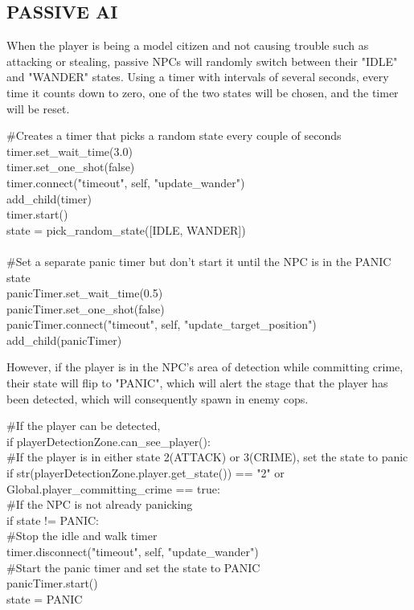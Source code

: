 \documentclass{article}
\begin{document}
\subsection{PASSIVE AI \label{passAI}}
When the player is being a model citizen and not causing trouble such as attacking or stealing, passive NPCs will randomly switch between their "IDLE" and "WANDER" states. Using a timer with intervals of several seconds, every time it counts down to zero, one of the two states will be chosen, and the timer will be reset.
\bigbreak
\begin{tabbing}
\#Creates a timer that picks a random state every couple of seconds\\
	timer.set\_wait\_time(3.0)\\
	timer.set\_one\_shot(false)\\
	timer.connect("timeout", self, "update\_wander")\\
	add\_child(timer)\\
	timer.start()\\
	state = pick\_random\_state([IDLE, WANDER])\\
	\\
	\#Set a separate panic timer but don't start it until the NPC is in the PANIC state\\
	panicTimer.set\_wait\_time(0.5)\\
	panicTimer.set\_one\_shot(false)\\
	panicTimer.connect("timeout", self, "update\_target\_position")\\
	add\_child(panicTimer)
\end{tabbing}
\bigbreak
However, if the player is in the NPC's area of detection while committing crime, their state will flip to "PANIC", which will alert the stage that the player has been detected, which will consequently spawn in enemy cops.
\bigbreak
\begin{tabbing}
\#If the player can be detected,\\
if playerDetectionZone.can\_see\_player():\\
	\hspace{.4cm}\#If the player is in either state 2(ATTACK) or 3(CRIME), set the state to panic\\
	\hspace{.4cm}if str(playerDetectionZone.player.get\_state()) == "2" or Global.player\_committing\_crime == true:\\
		\hspace{.8cm}\#If the NPC is not already panicking\\
		\hspace{.8cm}if state != PANIC:\\
			\hspace{1.2cm}\#Stop the idle and walk timer\\
			\hspace{1.2cm}timer.disconnect("timeout", self, "update\_wander")\\
			\hspace{1.2cm}\#Start the panic timer and set the state to PANIC\\
			\hspace{1.2cm}panicTimer.start()\\
			\hspace{1.2cm}state = PANIC
\end{tabbing}
\end{document}
